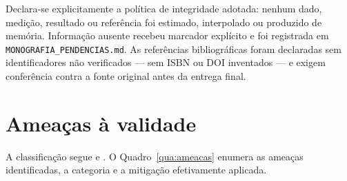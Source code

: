 Declara-se explicitamente a política de integridade adotada: nenhum dado,
medição, resultado ou referência foi estimado, interpolado ou produzido de
memória. Informação ausente recebeu marcador explícito e foi registrada em
\texttt{MONOGRAFIA\_PENDENCIAS.md}. As referências bibliográficas foram
declaradas sem identificadores não verificados --- sem ISBN ou DOI inventados
--- e exigem conferência contra a fonte original antes da entrega final.

\section{Ameaças à validade}
\label{sec:ameacas}

A classificação segue  e . O
Quadro~\ref{qua:ameacas} enumera as ameaças identificadas, a categoria e a
mitigação efetivamente aplicada.

